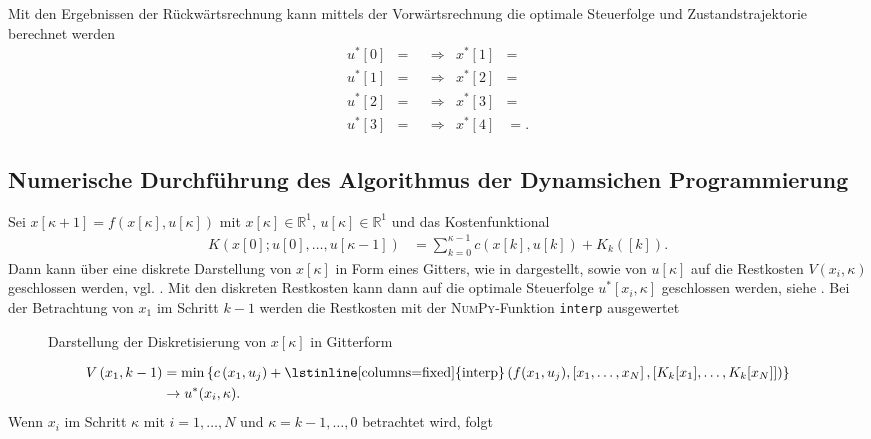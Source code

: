 \begin{exmp}
\begin{enumerate}[label=(S\arabic*)]
\end{enumerate}
Mit den Ergebnissen der Rückwärtsrechnung kann mittels der Vorwärtsrechnung die optimale Steuerfolge und
Zustandstrajektorie berechnet werden
\begin{align*}
u^{\ast}[0] & =  && \Rightarrow  &x^{\ast}[1]& = \\
u^{\ast}[1] & =  && \Rightarrow  &x^{\ast}[2]& = \\
u^{\ast}[2] & =  && \Rightarrow  &x^{\ast}[3]& = \\
u^{\ast}[3] & =  && \Rightarrow & x^{\ast}[4] & = .
\end{align*}

\end{exmp}

\subsection{Numerische Durchführung des Algorithmus der Dynamsichen Programmierung}
Sei $x[\kappa+1] = f\left(x[\kappa],u[\kappa] \right)$ mit $x[\kappa]\in\mathbb{R}^1$, $u[\kappa]\in\mathbb{R}^1$ und das Kostenfunktional
\begin{align*}
	K\left(x[0];u[0],\ldots,u[\kappa-1] \right) & = \sum\limits_{k=0}^{\kappa-1}c\left(x[k],u[k] \right)+K_k([k]).
\end{align*}
Dann kann über eine diskrete Darstellung von $x[\kappa]$ in Form eines Gitters, wie in  dargestellt, sowie von
$u[\kappa]$ auf die Restkosten $V(x_i,\kappa)$ geschlossen werden, vgl. . Mit den diskreten Restkosten kann dann
auf die optimale Steuerfolge $u^{\ast}[x_i,\kappa]$ geschlossen werden, siehe . Bei der Betrachtung von $x_1$ im
Schritt $k-1$ werden die Restkosten mit der \textsc{NumPy}-Funktion \lstinline[columns=fixed]{interp} ausgewertet
\begin{figure}[!htb]
	\centering
	
	\caption{Darstellung der Diskretisierung von $x[\kappa]$ in Gitterform}
	\label{fig:kap_3_dyn_prog_xgitter}
\end{figure}
\begin{align*}
	V\left(x_1, k-1 \right) & = \min\left\{c\left(x_1,u_j \right)+
	\text{\lstinline[columns=fixed]{interp}}\left(f(x_1,u_j),\left[x_1,\ldots,x_N\right],\left[K_k[x_1],\ldots,K_k[x_N] \right] \right) \right\}\\
	& \rightarrow u^{\ast}(x_i,\kappa).
\end{align*}
Wenn $x_i$ im Schritt $\kappa$ mit $i=1,\ldots,N$ und $\kappa=k-1,\ldots,0$ betrachtet wird, folgt
